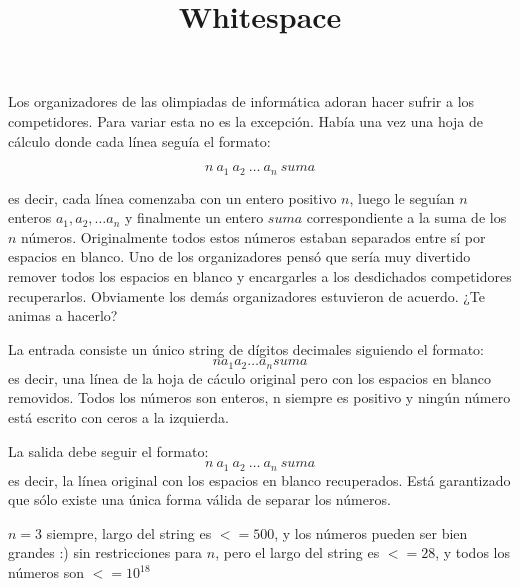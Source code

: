 \documentclass{oci}
\title{Whitespace}
\begin{document}
\begin{problemDescription}
Los organizadores de las olimpiadas de informática adoran hacer sufrir a los competidores. Para variar esta no es la excepción. Había una vez una hoja de cálculo donde cada línea seguía el formato:

$$n\ a_1\ a_2\ \dots\ a_n\ suma$$

es decir, cada línea comenzaba con un entero positivo $n$, luego le seguían $n$ enteros $a_1, a_2, \dots a_n$ y finalmente un entero $suma$ correspondiente a la suma de los $n$ números. Originalmente todos estos números estaban separados entre sí por espacios en blanco. Uno de los organizadores pensó que sería muy divertido remover todos los espacios en blanco y encargarles a los desdichados competidores recuperarlos. Obviamente los demás organizadores estuvieron de acuerdo. ¿Te animas a hacerlo?
\end{problemDescription}

\begin{inputDescription}
La entrada consiste un único string de dígitos decimales siguiendo el formato:
$$n a_1 a_2 \dots a_n suma$$
es decir, una línea de la hoja de cáculo original pero con los espacios en blanco removidos. Todos los números son enteros, n siempre es positivo y ningún número está escrito con ceros a la izquierda.
\end{inputDescription}

\begin{outputDescription}
La salida debe seguir el formato:
$$n\ a_1\ a_2\ \dots\ a_n\ suma$$
es decir, la línea original con los espacios en blanco recuperados. Está garantizado que sólo existe una única forma válida de separar los números.
\end{outputDescription}

\begin{scoreDescription}
   $n = 3$ siempre, largo del string es $<= 500$, y los números pueden ser bien grandes :)
   sin restricciones para $n$, pero el largo del string es $<= 28$, y todos los números son $ <= 10^{18}$
\end{scoreDescription}

\begin{sampleDescription}
\end{sampleDescription}
\end{document}
